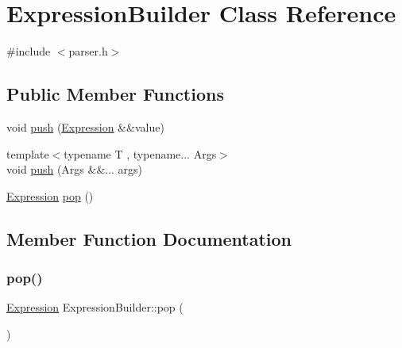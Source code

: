 \hypertarget{class_expression_builder}{}\section{Expression\+Builder Class Reference}
\label{class_expression_builder}


{\ttfamily \#include $<$parser.\+h$>$}

\subsection*{Public Member Functions}
\begin{DoxyCompactItemize}
\item 
void \hyperlink{class_expression_builder_a20f65da34d3e9f978659e6f5d99b48fe}{push} (\hyperlink{ast_8h_a4cb273a4d960cd13ea17d08f254493e8}{Expression} \&\&value)
\item 
{\footnotesize template$<$typename T , typename... Args$>$ }\\void \hyperlink{class_expression_builder_ad9f2da939e7864548ae857d40405160a}{push} (Args \&\&... args)
\item 
\hyperlink{ast_8h_a4cb273a4d960cd13ea17d08f254493e8}{Expression} \hyperlink{class_expression_builder_a9b572cfa4152ab0f8139d6d6f19ba9b2}{pop} ()
\end{DoxyCompactItemize}


\subsection{Member Function Documentation}
\mbox{\label{class_expression_builder_a9b572cfa4152ab0f8139d6d6f19ba9b2}} 
\subsubsection{\texorpdfstring{pop()}{pop()}}
{\footnotesize\ttfamily \hyperlink{ast_8h_a4cb273a4d960cd13ea17d08f254493e8}{Expression} Expression\+Builder\+::pop (\begin{DoxyParamCaption}{ }\end{DoxyParamCaption})\hspace{0.3cm}{\ttfamily [inline]}}

\mbox{\label{class_expression_builder_a20f65da34d3e9f978659e6f5d99b48fe}} 
